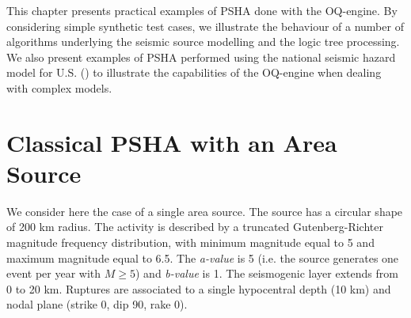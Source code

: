 This chapter presents practical examples of PSHA done with the OQ-engine. By considering simple synthetic test cases, we illustrate the behaviour of a number of algorithms underlying the seismic source modelling
and the logic tree processing. We also present examples of PSHA performed using the national seismic hazard model for U.S. (\cite{petersen2008}) to illustrate the capabilities of the OQ-engine when dealing with complex
models.

\section{Classical PSHA with an Area Source}
We consider here the case of a single area source. The source has a circular shape of 200 km radius. The activity
is described by a truncated Gutenberg-Richter magnitude frequency distribution, with minimum magnitude
equal to 5 and maximum magnitude equal to 6.5. The \textit{a-value} is 5 (i.e. the source generates one
event per year with $M \ge 5$) and \textit{b-value} is 1. The seismogenic layer extends from 0 to 20 km.
Ruptures are associated to a single hypocentral depth (10 km) and nodal plane (strike 0, dip 90, rake 0).

